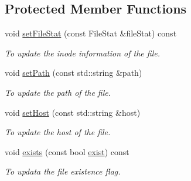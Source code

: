 \subsection*{Protected Member Functions}
\begin{DoxyCompactItemize}
\item 
void \hyperlink{classFileProxy_a71932df80ba2eed57646a82fa76f1f82}{setFileStat} (const FileStat \&fileStat) const 
\begin{DoxyCompactList}\small\item\em To update the inode information of the file. \item\end{DoxyCompactList}\item 
void \hyperlink{classFileProxy_a1ac8b636eb64061b0e49f1db682abe11}{setPath} (const std::string \&path)
\begin{DoxyCompactList}\small\item\em To update the path of the file. \item\end{DoxyCompactList}\item 
void \hyperlink{classFileProxy_a78b50d4575e297b09610faa109f1e2e9}{setHost} (const std::string \&host)
\begin{DoxyCompactList}\small\item\em To update the host of the file. \item\end{DoxyCompactList}\item 
void \hyperlink{classFileProxy_aac43c3df26e659bdf71f6ad4828aa884}{exists} (const bool \hyperlink{classFileProxy_a4b0e346c8e0cee89598bb44357703ffa}{exist}) const 
\begin{DoxyCompactList}\small\item\em To updata the file existence flag. \item\end{DoxyCompactList}\end{DoxyCompactItemize}
